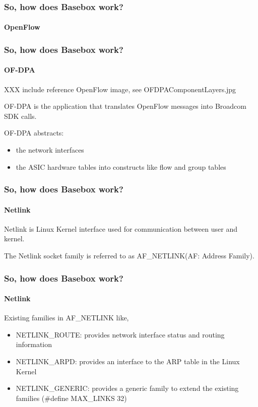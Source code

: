 \documentclass[11pt]{beamer}
\begin{document}
\begin{frame}
\begin{frame}
\frametitle{So, how does Basebox work?}
\framesubtitle{OpenFlow}




\end{frame}

\begin{frame}
\frametitle{So, how does Basebox work?}
\framesubtitle{OF-DPA}
\begin{minipage}[t]{0.48\linewidth}
	XXX include reference OpenFlow image, see OFDPAComponentLayers.jpg
\end{minipage}\hfill
\begin{minipage}[t]{0.48\linewidth}

   	OF-DPA is the application that translates OpenFlow messages into Broadcom SDK calls.
	
	OF-DPA abstracts:

	\begin{itemize}
	\item the network interfaces

	\item the ASIC hardware tables into constructs like flow and group tables
	\end{itemize}
\end{minipage}\hfill
\end{frame}

\begin{frame}
\frametitle{So, how does Basebox work?}
\framesubtitle{Netlink}

Netlink is Linux Kernel interface used for communication between user and kernel.

The Netlink socket family is referred to as AF\_NETLINK(AF: Address Family).

\end{frame}

\begin{frame}
\frametitle{So, how does Basebox work?}
\framesubtitle{Netlink}

Existing families in AF\_NETLINK like,

\begin{itemize}
\item NETLINK\_ROUTE: provides network interface status and routing information
\item NETLINK\_ARPD: provides an interface to the ARP table in the Linux Kernel
\item NETLINK\_GENERIC: provides a generic family to extend the existing families (\#define MAX\_LINKS 32) %
\end{itemize}


\end{frame}
\end{frame}
\end{document}
